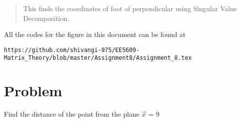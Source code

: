 \documentclass[journal,12pt,twocolumn]{IEEEtran}
\begin{document}
% 
\maketitle
\newpage
\bigskip
\renewcommand{\thefigure}{\theenumi}
\renewcommand{\thetable}{\theenumi}
\begin{abstract}
This finds the coordinates of foot of perpendicular using Singular Value Decomposition.
\end{abstract}
All the codes for the figure in this document can be found at
\begin{lstlisting}
https://github.com/shivangi-975/EE5609-Matrix_Theory/blob/master/Assignment8/Assignment_8.tex
\end{lstlisting}
\section{\textbf{Problem}}
Find the distance of the point  from the plane $\vec{x}$ = 9
\end{document}
